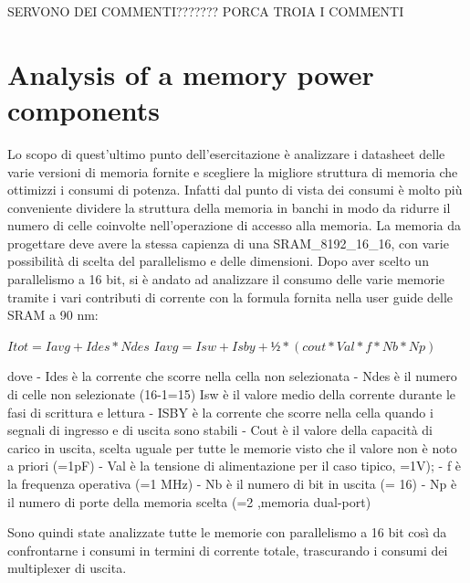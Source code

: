 SERVONO DEI COMMENTI??????? PORCA TROIA I COMMENTI

\section{Analysis of a memory power components}
Lo scopo di quest’ultimo punto dell’esercitazione è  analizzare i datasheet delle varie versioni di memoria fornite e scegliere la migliore struttura di memoria che ottimizzi i consumi di potenza. Infatti dal punto di vista dei consumi è molto più conveniente dividere la struttura della memoria in banchi in modo da ridurre il numero di celle coinvolte nell’operazione di accesso alla memoria. 
La memoria da progettare deve avere la stessa capienza di una SRAM_8192_16_16, con varie possibilità di scelta del parallelismo e delle dimensioni.
Dopo aver scelto un parallelismo a 16 bit, si è andato ad analizzare il consumo delle varie memorie tramite i vari contributi di corrente con la formula fornita nella user guide delle SRAM a 90 nm:

$Itot= Iavg+Ides*Ndes$
$Iavg=Isw+Isby+½*(cout*Val*f*Nb*Np)$

dove
- Ides è la corrente che scorre nella cella non selezionata
- Ndes è il numero di celle non selezionate (16-1=15)
Isw è il valore medio della corrente durante le fasi di scrittura e lettura
- ISBY è la corrente che scorre nella cella quando i segnali di ingresso e di uscita sono stabili
- Cout è il valore della capacità di carico in uscita, scelta uguale per tutte le memorie visto che il valore non è noto a priori (=1pF)
- Val è la tensione di alimentazione per il caso tipico, =1V);
- f è la frequenza operativa (=1 MHz)
- Nb è il numero di bit in uscita (= 16)
- Np è il numero di porte della memoria scelta (=2 ,memoria dual-port)

Sono quindi state analizzate tutte le memorie con parallelismo a 16 bit così da confrontarne i consumi in termini di corrente totale, trascurando i consumi dei multiplexer di uscita.

